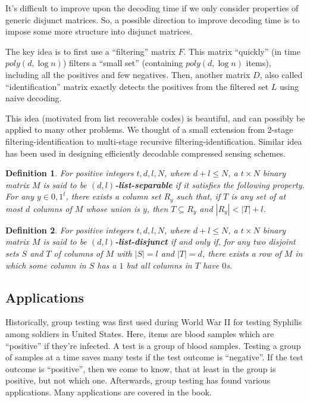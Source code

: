 \documentclass{article}
\newtheorem{definition}{Definition}
\begin{document}
It's difficult to improve upon the decoding time if we only consider
properties of generic disjunct matrices. So, a possible direction to improve
decoding time is to impose some more structure into disjunct matrices.

The key idea\cite{rudra709lec6} is to first use a ``filtering'' matrix $F$. This matrix
``quickly'' (in time $poly(d,\log{n})$) filters a ``small set'' (containing $poly(d,\log{n})$
items), including all the positives and few negatives. Then, another matrix $D$, also called
``identification'' matrix exactly detects the positives from the filtered set $L$ using
naive decoding.

This idea (motivated from list recoverable codes) is beautiful, and can possibly be applied
to many other problems. We thought of a small extension from 2-stage filtering-identification
to multi-stage recursive filtering-identification. Similar idea has been used in designing
efficiently decodable compressed sensing schemes\cite{DBLP:conf/stacs/NgoPR12}.

\begin{definition}
  For positive integers $t,d,l,N$, where $d + l \le N$, a $t \times N$ binary matrix $M$
  is said to be \textbf{$(d,l)$-list-separable} if it satisfies the following property.
  For any $y \in {0,1}^t$, there exists a column set $R_y$ such that, if $T$ is any set of
  at most $d$ columns of $M$ whose union is $y$, then $T \subseteq R_y$ and $|R_y| < |T| + l$.
\end{definition}

\begin{definition}
  For positive integers $t,d,l,N$, where $d + l \le N$, a $t \times N$ binary matrix $M$ is said
  to be \textbf{$(d,l)$-list-disjunct} if and only if, for any two disjoint sets $S$ and $T$ of
  columns of $M$ with $|S| = l$ and $|T| = d$, there exists a row of $M$ in which some column in $S$
  has a $1$ but all columns in $T$ have $0$s.
\end{definition}

\subsection{Applications}
Historically, group testing was first used during World War II for testing Syphilis
among soldiers in United States. Here, items are blood samples which are ``positive''
if they're infected. A test is a group of blood samples. Testing a group of samples at
a time saves many tests if the test outcome is ``negative''. If the test outcome is
``positive'', then we come to know, that at least in the group is positive, but not which one.
Afterwards, group testing has found various applications. Many applications are covered
in the book.\cite{du1993combinatorial}
\end{document}
